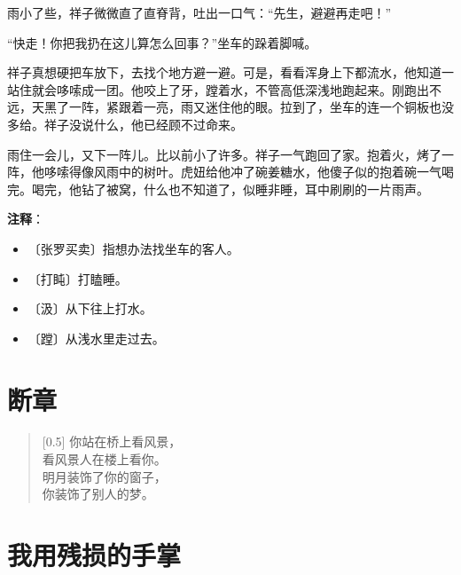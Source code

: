 \documentclass[12pt,UTF-8,openany]{ctexbook}
\begin{document}
\begin{large}
    雨小了些，祥子微微直了直脊背，吐出一口气：“先生，避避再走吧！”
    
    “快走！你把我扔在这儿算怎么回事？”坐车的跺着脚喊。
    
    祥子真想硬把车放下，去找个地方避一避。可是，看看浑身上下都流水，他知道一站住就会哆嗦成一团。他咬上了牙，蹚着水，不管高低深浅地跑起来。刚跑出不远，天黑了一阵，紧跟着一亮，雨又迷住他的眼。拉到了，坐车的连一个铜板也没多给。祥子没说什么，他已经顾不过命来。
    
    雨住一会儿，又下一阵儿。比以前小了许多。祥子一气跑回了家。抱着火，烤了一阵，他哆嗦得像风雨中的树叶。虎妞给他冲了碗姜糖水，他傻子似的抱着碗一气喝完。喝完，他钻了被窝，什么也不知道了，似睡非睡，耳中刷刷的一片雨声。
    
\end{large}


\newpage

\textbf{注释}：

\vspace{-1em}

\begin{itemize}
    \setlength\itemsep{-0.2em}
    \item 〔张罗买卖〕指想办法找坐车的客人。
    \item 〔打盹〕打瞌睡。
    \item 〔汲〕从下往上打水。
    \item 〔蹚〕从浅水里走过去。
\end{itemize}

\chapter{断章}

\begin{large}
    
    \begin{verse}[0.5\linewidth]
        你站在桥上看风景， \\
        看风景人在楼上看你。 \\
        明月装饰了你的窗子， \\
        你装饰了别人的梦。
    \end{verse}
    
\end{large}



\chapter{我用残损的手掌}
\end{document}
